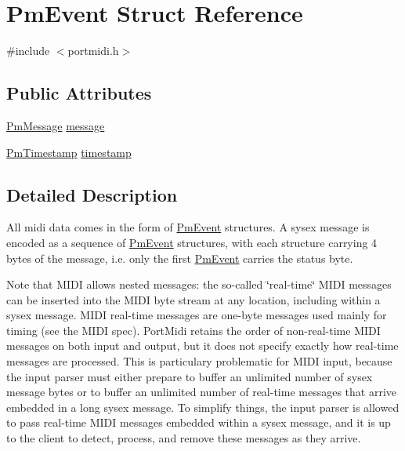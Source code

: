 \hypertarget{struct_pm_event}{}\section{Pm\+Event Struct Reference}
\label{struct_pm_event}


{\ttfamily \#include $<$portmidi.\+h$>$}

\subsection*{Public Attributes}
\begin{DoxyCompactItemize}
\item 
\hyperlink{group__grp__events__filters_gad8455e4afe978a74c68e345bef99761d}{Pm\+Message} \hyperlink{struct_pm_event_a2c8c12542447fdd566401fbf1a83d4e2}{message}
\item 
\hyperlink{portmidi_8h_acf4245beeef251c4a46d66e99d77ffdf}{Pm\+Timestamp} \hyperlink{struct_pm_event_a3854d39e3b89e1e2a4e1fda8d85c2f16}{timestamp}
\end{DoxyCompactItemize}


\subsection{Detailed Description}
All midi data comes in the form of \hyperlink{struct_pm_event}{Pm\+Event} structures. A sysex message is encoded as a sequence of \hyperlink{struct_pm_event}{Pm\+Event} structures, with each structure carrying 4 bytes of the message, i.\+e. only the first \hyperlink{struct_pm_event}{Pm\+Event} carries the status byte.

Note that M\+I\+DI allows nested messages\+: the so-\/called \char`\"{}real-\/time\char`\"{} M\+I\+DI messages can be inserted into the M\+I\+DI byte stream at any location, including within a sysex message. M\+I\+DI real-\/time messages are one-\/byte messages used mainly for timing (see the M\+I\+DI spec). Port\+Midi retains the order of non-\/real-\/time M\+I\+DI messages on both input and output, but it does not specify exactly how real-\/time messages are processed. This is particulary problematic for M\+I\+DI input, because the input parser must either prepare to buffer an unlimited number of sysex message bytes or to buffer an unlimited number of real-\/time messages that arrive embedded in a long sysex message. To simplify things, the input parser is allowed to pass real-\/time M\+I\+DI messages embedded within a sysex message, and it is up to the client to detect, process, and remove these messages as they arrive.

